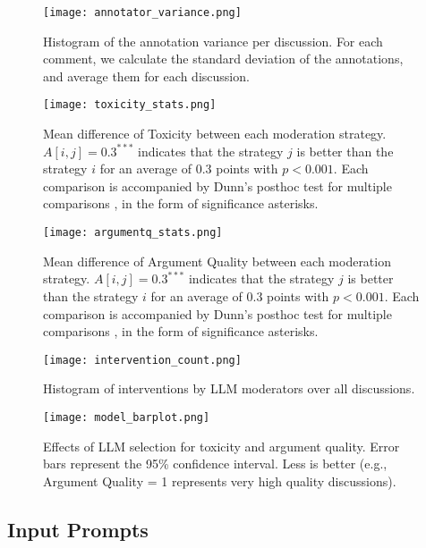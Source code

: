 \begin{figure}[H]
	\centering
	\texttt{[image: annotator\_variance.png]}
	\caption{Histogram of the annotation variance per discussion. For each comment, we calculate the standard deviation of the annotations, and average them for each discussion.}
	\label{fig::annotator_variance}
\end{figure}

\begin{figure}[H]
	\centering
	\texttt{[image: toxicity\_stats.png]}
	\caption{Mean difference of Toxicity between each moderation strategy. $A[i, j] = 0.3^{***}$ indicates that the strategy $j$ is better than the strategy $i$ for an average of $0.3$ points with $p<0.001$. Each comparison is accompanied by Dunn's posthoc test for multiple comparisons \cite{dunn}, in the form of significance asterisks.}
	\label{fig::toxicity_stats}
\end{figure}

\begin{figure}[H]
	\centering
	\texttt{[image: argumentq\_stats.png]}
	\caption{Mean difference of Argument Quality between each moderation strategy. $A[i, j] = 0.3^{***}$ indicates that the strategy $j$ is better than the strategy $i$ for an average of $0.3$ points with $p<0.001$. Each comparison is accompanied by Dunn's posthoc test for multiple comparisons \cite{dunn}, in the form of significance asterisks.}
	\label{fig::argumentq_stats}
\end{figure}

\begin{figure}[H]
	\centering
	\texttt{[image: intervention\_count.png]}
	\caption{Histogram of interventions by LLM moderators over all discussions.}
	\label{fig::intervention_count}
\end{figure}

\begin{figure}[H]
	\centering
	\texttt{[image: model\_barplot.png]}
	\caption{Effects of \ac{LLM} selection for toxicity and argument quality. Error bars represent the 95\% confidence interval. Less is better (e.g., Argument Quality = 1 represents very high quality discussions).}
	\label{fig::model_barplot}
\end{figure}

\subsection{Input Prompts}

